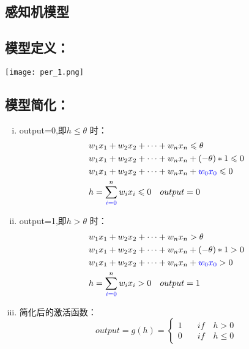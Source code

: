\documentclass{article}
\begin{document}
\begin{CJK*}{UTF8}{gbsn}

\boldmath
\tableofcontents
\section{感知机模型}
\subsection{模型定义：}
\quad \quad
\texttt{[image: per\_1.png]}
\subsection{模型简化：}

\begin{enumerate}[(i)]
\item output=0,即$h \leqslant \theta$ 时：\\
$$
\begin{aligned}
& w_{1}x_{1} + w_{2}x_{2} + \cdots + w_{n}x_{n} \leqslant \theta \\
& w_{1}x_{1} + w_{2}x_{2} + \cdots + w_{n}x_{n} +  (-\theta) * 1 \leqslant 0 \\
& w_{1}x_{1} + w_{2}x_{2} + \cdots + w_{n}x_{n} + \textcolor{blue}{ w_{0}x_{0} }\leqslant 0 \\
& h = \sum_{\textcolor{blue}{ i=0} }^{n}w_{i}x_{i} \leqslant 0 \quad output=0
\end{aligned}
$$

\item output=1,即$h > \theta$ 时：\\
$$
\begin{aligned}
& w_{1}x_{1} + w_{2}x_{2} + \cdots + w_{n}x_{n} > \theta \\
& w_{1}x_{1} + w_{2}x_{2} + \cdots + w_{n}x_{n} +  (-\theta) * 1 > 0 \\
& w_{1}x_{1} + w_{2}x_{2} + \cdots + w_{n}x_{n} + \textcolor{blue}{ w_{0}x_{0} }> 0 \\
& h = \sum_{\textcolor{blue}{ i=0} }^{n}w_{i}x_{i} > 0 \quad output=1
\end{aligned}
$$

\item 简化后的激活函数：
$$
output = g\left(h\right) = \left\{
\begin{aligned}
1\quad  & if \quad h > 0 \\
0 \quad & if \quad h \leqslant 0
\end{aligned}
\right.
$$


\end{enumerate}
\end{CJK*}
\end{document}
